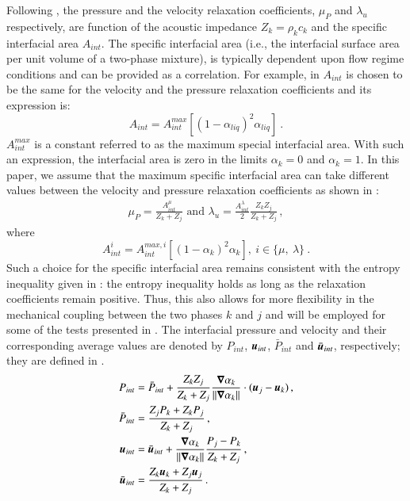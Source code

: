 \documentclass[preprint,10pt]{elsarticle}
\begin{document}
Following \cite{Berry_NED2010}, the pressure and the velocity relaxation coefficients, $\mu_P$  and $\lambda_u$ respectively, are function of the acoustic 
impedance $Z_k = \rho_k c_k$ and the specific interfacial area $A_{int}$. The specific interfacial area (i.e., the interfacial surface area per unit
volume of a two-phase mixture), is typically dependent upon flow regime conditions and can be provided as a correlation. For example,
in \cite{Berry_NED2010} $A_{int}$ is chosen to be the same for the velocity and the pressure relaxation coefficients and its expression is:
%
\begin{equation}\label{eq:Aint-def}
A_{int} = A_{int}^{max} \left[ \left(1-\alpha_{liq} \right)^2 \alpha_{liq} \right] \ .
\end{equation}
% 
$A_{int}^{max}$ is a constant referred to as the maximum special interfacial area. %
With such an expression, the interfacial area is zero in the limits $\alpha_{k} = 0$ and $\alpha_{k} = 1$.
In this paper, we assume that the maximum specific interfacial area can take different values between the velocity and pressure relaxation 
coefficients as shown in :
%
\begin{subequations}
\label{eq:relaxation_coeff}
\begin{align}
  \label{E-R:86}
  \mu_P = \frac{A_{int}^\mu}{Z_{k}+Z_{j}} 
  \text{ and }
  \lambda_u = \frac{A_{int}^\lambda}{2}  \frac{Z_{k} Z_{j}}{Z_{k}+Z_{j}} \, ,
\end{align}
\end{subequations}
%
where
%
\begin{equation}\label{eq:Aint-sect4}
A_{int}^i = A_{int}^{max,i} \left[ \left(1-\alpha_{k} \right)^2 \alpha_{k} \right] , \ i \in \{ \mu, \ \lambda \} \ .
\end{equation}
%
Such a choice for the specific interfacial area remains consistent with the entropy inequality given in : the entropy inequality holds 
as long as the relaxation coefficients remain positive. Thus, this also allows for more 
flexibility in the mechanical coupling between the two phases $k$ and $j$ and will be employed for some of the tests presented in .
%
The interfacial pressure and velocity and their corresponding average values are denoted by $P_{int}$, $\boldsymbol u_{int}$, 
$\bar{P}_{int}$ and $\bar{\boldsymbol u}_{int}$, respectively; they are defined in .
%
\begin{subequations}
\label{eq:int_variables_def}
\begin{align}
  \label{E-R:83}
  P_{int} &= \bar{P}_{int} + \frac{Z_{k}Z_{j}}{Z_{k}+Z_{j}} \frac{\boldsymbol\nabla \alpha_{k}}{|| \boldsymbol\nabla \alpha_{k} ||} \cdot (\boldsymbol u_{j}-\boldsymbol u_{k}) \,,
  \\
  \bar{P}_{int} &= \frac{Z_{j}P_{k}+Z_{k}P_{j}}{Z_{k}+Z_{j}} \,,
 \\
  \label{E-R:84}
  \boldsymbol u_{int} &= \bar{\boldsymbol u}_{int} +  \frac{\boldsymbol\nabla \alpha_{k}}{|| \boldsymbol\nabla \alpha_{k} ||} \frac{P_{j}-P_{k}}{Z_{k}+Z_{j}} \,,
  \\
  \bar{\boldsymbol u}_{int} &= \frac{Z_{k} \boldsymbol u_{k}+Z_{j}\boldsymbol u_{j}}{Z_{k}+Z_{j}} \,.
\end{align}
\end{subequations}
\end{document}
